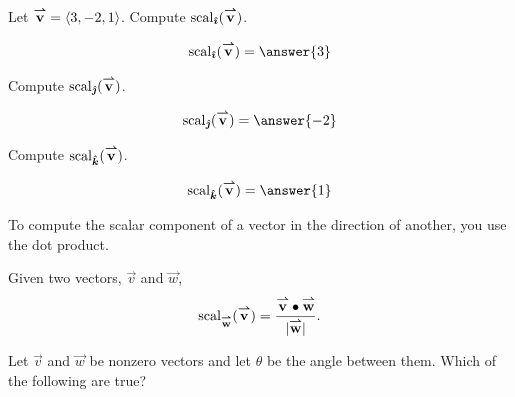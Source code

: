 \documentclass{ximera}
\begin{document}
\begin{question}
  Let $\vec{v} = \vector{3,-2,1}$. Compute $\scal_\veci(\vec{v})$.
  \begin{prompt}
    \[
    \scal_\veci(\vec{v}) = \answer{3}
    \]
  \end{prompt}
  \begin{question}
    Compute $\scal_\vecj(\vec{v})$.
    \begin{prompt}
      \[
      \scal_\vecj(\vec{v}) = \answer{-2}
      \]
    \end{prompt}
    \begin{question}
      Compute $\scal_\veck(\vec{v})$.
      \begin{prompt}
        \[
        \scal_\veck(\vec{v}) = \answer{1}
        \]
      \end{prompt}
    \end{question}
  \end{question}
\end{question}
To compute the scalar component of a vector in the direction of
another, you use the dot product.

\begin{theorem}
  Given two vectors, $\vec{v}$ and $\vec{w}$,
  \[
  \scal_\vec{w}(\vec{v}) =\frac{\vec{v} \dotp \vec{w}}{|\vec{w}|}.
  \]
\end{theorem}

\begin{question}
  Let $\vec{v}$ and $\vec{w}$ be nonzero vectors and let $\theta$ be
  the angle between them. Which of the following are true?
  \begin{selectAll}
  \end{selectAll}
\end{question}
\end{document}

